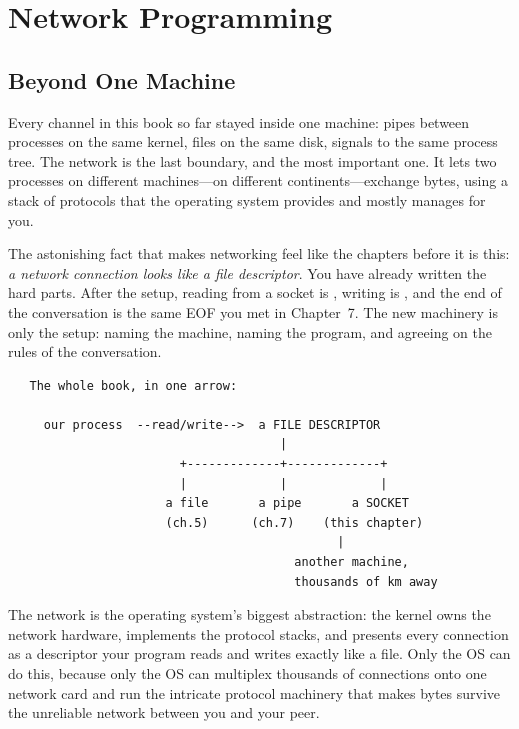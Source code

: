 
\chapter{Network Programming}

\section{Beyond One Machine}

Every channel in this book so far stayed inside one machine: pipes
between processes on the same kernel, files on the same disk, signals
to the same process tree. The network is the last boundary, and the
most important one. It lets two processes on different machines---on
different continents---exchange bytes, using a stack of protocols that
the operating system provides and mostly manages for you.

The astonishing fact that makes networking feel like the chapters
before it is this: \emph{a network connection looks like a file
descriptor}. You have already written the hard parts. After the setup,
reading from a socket is , writing is , and the
end of the conversation is the same EOF you met in Chapter~7. The new
machinery is only the setup: naming the machine, naming the program,
and agreeing on the rules of the conversation.

\begin{verbatim}
   The whole book, in one arrow:

     our process  --read/write-->  a FILE DESCRIPTOR
                                      |
                        +-------------+-------------+
                        |             |             |
                      a file       a pipe       a SOCKET
                      (ch.5)      (ch.7)    (this chapter)
                                              |
                                        another machine,
                                        thousands of km away
\end{verbatim}

\begin{osconcept}
The network is the operating system's biggest abstraction: the kernel
owns the network hardware, implements the protocol stacks, and
presents every connection as a descriptor your program reads and
writes exactly like a file. Only the OS can do this, because only the
OS can multiplex thousands of connections onto one network card and
run the intricate protocol machinery that makes bytes survive the
unreliable network between you and your peer.
\end{osconcept}

